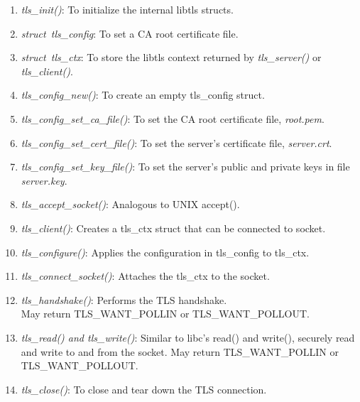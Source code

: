 \documentclass[11pt]{article}
\begin{document}
\begin{enumerate}
    \item \textit{tls\_init()}: To initialize the internal libtls structs.
    \item \textit{struct\ tls\_config}: To set a CA root certificate file.
    \item \textit{struct\ tls\_ctx}: To store the libtls context returned by \textit{tls\_server()} or \textit{tls\_client()}.
    \item \textit{tls\_config\_new()}: To create an empty tls\_config struct.
    \item \textit{tls\_config\_set\_ca\_file()}: To set the CA root certificate file, \textit{root.pem}.
    \item \textit{tls\_config\_set\_cert\_file()}: To set the server's certificate file, \textit{server.crt}.
    \item \textit{tls\_config\_set\_key\_file()}: To set the server's public and private keys in file \textit{server.key}.
    \item \textit{tls\_accept\_socket()}: Analogous to UNIX accept().
    \item \textit{tls\_client()}: Creates a tls\_ctx struct that can be connected to socket.
    \item \textit{tls\_configure()}: Applies the configuration in tls\_config to tls\_ctx.
    \item \textit{tls\_connect\_socket()}: Attaches the tls\_ctx to the socket.
    \item \textit{tls\_handshake()}: Performs the TLS handshake. \\ May return TLS\_WANT\_POLLIN or TLS\_WANT\_POLLOUT.
    \item \textit{tls\_read() and tls\_write()}: Similar to libc's read() and write(), securely read and write to and from the socket. May return TLS\_WANT\_POLLIN or TLS\_WANT\_POLLOUT.
    \item \textit{tls\_close()}: To close and tear down the TLS connection.
\end{enumerate}
\end{document}
